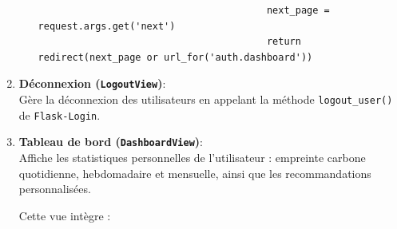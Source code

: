 \documentclass[a4paper,11pt]{article}
\begin{document}
\begin{enumerate}
\begin{itemize}
                                \begin{tcolorbox}[colback=lightgray!6, colframe=black, left=-60mm, right=5mm, top=2mm, bottom=0mm, boxrule=0.1mm]
                                    \begin{verbatim}
                                        next_page = request.args.get('next')
                                        return redirect(next_page or url_for('auth.dashboard'))
                                    \end{verbatim}
                                \end{tcolorbox}
                        \end{itemize}

                    \item \textbf{Déconnexion (\texttt{LogoutView})}:\\
                        \noindent Gère la déconnexion des utilisateurs en appelant la méthode \texttt{logout\_user()} de \texttt{Flask-Login}.

                    \item \textbf{Tableau de bord (\texttt{DashboardView})}:\\
                        \noindent Affiche les statistiques personnelles de l'utilisateur : empreinte carbone quotidienne, hebdomadaire et mensuelle, ainsi que les recommandations personnalisées.

                        \noindent Cette vue intègre :


\end{enumerate}
\end{document}
